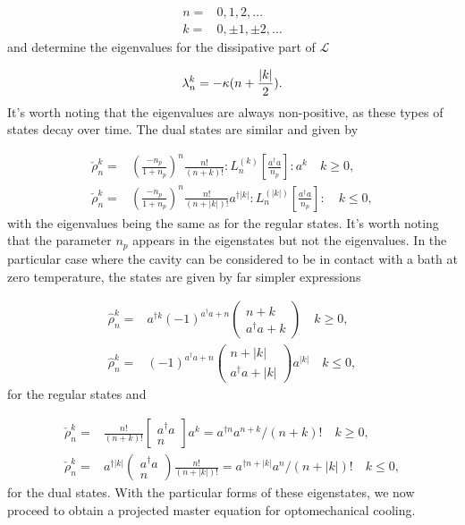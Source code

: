 \documentclass[12pt]{article}
\begin{document}
\begin{align}
    n=&0,1,2,\dots \\
    k=&0,\pm 1,\pm 2, \dots
\end{align} and determine the eigenvalues for the dissipative part of $\mathcal{L}$

\begin{equation}
    \lambda_n^k=-\kappa (n+\frac{\abs{k}}{2}).
\end{equation} It's worth noting that the eigenvalues are always non-positive, as these types of states decay over time. The dual states are similar and given by

\begin{align}
    \check{\rho}_n^k=&\left(\frac{-n_p}{1+n_p}\right)^{n} \frac{n !}{(n+k) !}: L_{n}^{(k)}\left[\frac{a^{\dagger} a}{n_p}\right]: a^{k} \quad  k \geq 0, \nonumber \\
   \check{\rho}_n^k=&\left(\frac{-n_p}{1+n_p}\right)^{n} \frac{n !}{(n+|k|) !} a^{\dagger|k|}: L_{n}^{(|k|)}\left[\frac{a^{\dagger} a}{n_p}\right]: \quad k \leq 0, \nonumber
\end{align} with the eigenvalues being the same as for the regular states. It's worth noting that the parameter $n_p$ appears in the eigenstates but not the eigenvalues. In the particular case where the cavity can be considered to be in contact with a bath at zero temperature, the states are given by far simpler expressions

\begin{align}
    \hat{\rho}_n^k=&\nonumber a^{\dagger k}(-1)^{a^{\dagger} a+n}\left(\begin{array}{c}
n+k \\
a^{\dagger} a+k
\end{array}\right) \quad k \geq 0, \\
\hat{\rho}_n^k=& \nonumber (-1)^{a^{\dagger} a+n}\left(\begin{array}{c}
n+|k| \\
a^{\dagger} a+|k|
\end{array}\right) a^{|k|} \quad k \leq 0,
\end{align} for the regular states and 

\begin{align}
    \check{\rho}_n^k =&\nonumber  \frac{n !}{(n+k) !}\left[\begin{array}{c}
a^{\dagger} a \\
n
\end{array}\right] a^{k}=a^{\dagger n} a^{n+k} /(n+k) ! \quad k \geq 0,\\
\check{\rho}_n^k =&\nonumber a^{\dagger|k|}\left(\begin{array}{c}
a^{\dagger} a \\
n
\end{array}\right) \frac{n !}{(n+|k|) !}=a^{\dagger n+|k|} a^{n} /(n+|k|) ! \quad k \leq 0,
\end{align} for the dual states. With the particular forms of these eigenstates, we now proceed to obtain a projected master equation for optomechanical cooling.
\end{document}
